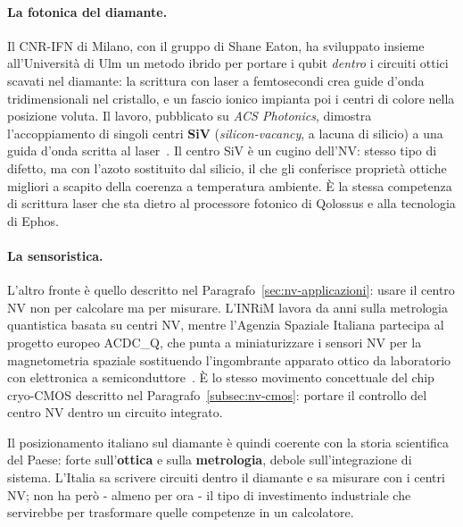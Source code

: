 \paragraph{La fotonica del diamante.}
Il CNR-IFN di Milano, con il gruppo di Shane Eaton, ha sviluppato insieme
all'Università di Ulm un metodo ibrido per portare i qubit \textit{dentro} i
circuiti ottici scavati nel diamante: la scrittura con laser a femtosecondi
crea guide d'onda tridimensionali nel cristallo, e un fascio ionico impianta
poi i centri di colore nella posizione voluta. Il lavoro, pubblicato su
\textit{ACS Photonics}, dimostra l'accoppiamento di singoli centri
\textbf{SiV} (\textit{silicon-vacancy}, a lacuna di silicio) a una guida
d'onda scritta al laser~\cite{eaton2022siv}. Il centro SiV è un cugino
dell'NV: stesso tipo di difetto, ma con l'azoto sostituito dal silicio, il che
gli conferisce proprietà ottiche migliori a scapito della coerenza a
temperatura ambiente. È la stessa competenza di scrittura laser che sta dietro
al processore fotonico di Qolossus e alla tecnologia di Ephos.

\paragraph{La sensoristica.}
L'altro fronte è quello descritto nel Paragrafo~\ref{sec:nv-applicazioni}:
usare il centro NV non per calcolare ma per misurare. L'INRiM lavora da anni
sulla metrologia quantistica basata su centri NV, mentre l'Agenzia Spaziale
Italiana partecipa al progetto europeo ACDC\_Q, che punta a miniaturizzare i
sensori NV per la magnetometria spaziale sostituendo l'ingombrante apparato
ottico da laboratorio con elettronica a semiconduttore~\cite{asi2025acdcq}. È
lo stesso movimento concettuale del chip cryo-CMOS descritto nel
Paragrafo~\ref{subsec:nv-cmos}: portare il controllo del centro NV dentro un
circuito integrato.

\begin{notabox}
  Il posizionamento italiano sul diamante è quindi coerente con la storia
  scientifica del Paese: forte sull'\textbf{ottica} e sulla
  \textbf{metrologia}, debole sull'integrazione di sistema. L'Italia sa
  scrivere circuiti dentro il diamante e sa misurare con i centri NV; non ha
  però - almeno per ora - il tipo di investimento industriale che servirebbe
  per trasformare quelle competenze in un calcolatore.
\end{notabox}

